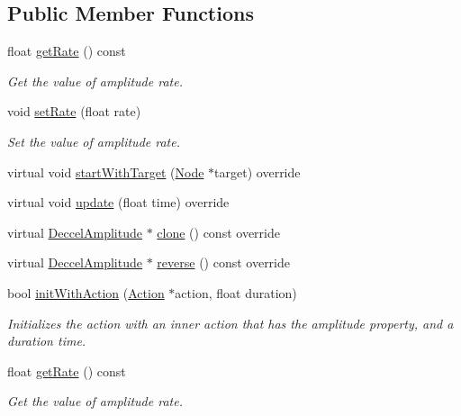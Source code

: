 \subsection*{Public Member Functions}
\begin{DoxyCompactItemize}
\item 
float \hyperlink{classDeccelAmplitude_ae08f5a309c66a2301ce57cb579457f10}{get\+Rate} () const
\begin{DoxyCompactList}\small\item\em Get the value of amplitude rate. \end{DoxyCompactList}\item 
void \hyperlink{classDeccelAmplitude_ad73ca698974b6643c865c6debaa0e6da}{set\+Rate} (float rate)
\begin{DoxyCompactList}\small\item\em Set the value of amplitude rate. \end{DoxyCompactList}\item 
virtual void \hyperlink{classDeccelAmplitude_a130c290651e4e5809bfc4f670825e30d}{start\+With\+Target} (\hyperlink{classNode}{Node} $\ast$target) override
\item 
virtual void \hyperlink{classDeccelAmplitude_a723e93602a70792b77435283425d0403}{update} (float time) override
\item 
virtual \hyperlink{classDeccelAmplitude}{Deccel\+Amplitude} $\ast$ \hyperlink{classDeccelAmplitude_a74b49064db52ceacf01ff30369251ef3}{clone} () const override
\item 
virtual \hyperlink{classDeccelAmplitude}{Deccel\+Amplitude} $\ast$ \hyperlink{classDeccelAmplitude_a57d1d15a1bfb1a397a78f21ae6d54d92}{reverse} () const override
\item 
bool \hyperlink{classDeccelAmplitude_ac0f006d31810192002d96826dc88a85b}{init\+With\+Action} (\hyperlink{classAction}{Action} $\ast$action, float duration)
\begin{DoxyCompactList}\small\item\em Initializes the action with an inner action that has the amplitude property, and a duration time. \end{DoxyCompactList}\item 
float \hyperlink{classDeccelAmplitude_ae08f5a309c66a2301ce57cb579457f10}{get\+Rate} () const
\begin{DoxyCompactList}\small\item\em Get the value of amplitude rate. \end{DoxyCompactList}\item 

\end{DoxyCompactItemize}
